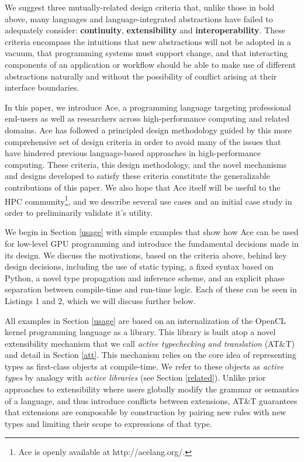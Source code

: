\documentclass{sig-alternate}
\begin{document}
We suggest three mutually-related {design criteria} that, unlike those in bold above, many languages and language-integrated abstractions have failed to adequately consider: \textbf{continuity}, \textbf{extensibility} and \textbf{interoperability}. These criteria encompass the intuitions that new abstractions will not be adopted in a vacuum, that programming systems must  support change, and that interacting components of an application or workflow should be able to make use of different abstractions naturally and without the possibility of conflict arising at their interface boundaries.

In this paper, we introduce Ace, a programming language targeting professional end-users as well as researchers across high-performance computing and related domains. Ace has followed a principled design methodology guided by this more comprehensive set of design criteria in order to avoid many of the issues that have hindered previous language-based approaches in high-performance computing. These criteria, this design methodology, and the novel mechanisms and designs developed to satisfy these criteria constitute the generalizable contributions of this paper. We also hope that Ace itself will be useful to the HPC community\footnote{\small Ace is openly available at http://acelang.org/.}, and we describe several use cases and an initial case study in order to preliminarily validate it's utility. 

 We begin in Section \ref{usage} with simple examples that show how Ace can be used for low-level GPU programming and introduce the fundamental decisions made in its design. We discuss the motivations, based on the criteria above, behind key design decisions, including the use of static typing, a fixed syntax based on Python, a novel type propagation and inference scheme, and an explicit phase separation between compile-time and run-time logic. Each of these can be seen in Listings 1 and 2, which we will discuss further below.
 
All examples in Section \ref{usage} are based on an internalization of the OpenCL kernel programming language as a library. This library is built atop a novel extensibility mechanism that we call \emph{active typechecking and translation} (AT\&T) and detail in Section \ref{att}. This mechanism relies on the core idea of representing types as first-class objects at compile-time. We refer to these objects as \emph{active types} by analogy with \emph{active libraries} \cite{activelibraries} (see Section \ref{related}). Unlike prior approaches to extensibility where users globally modify the grammar or semantics of a language, and thus introduce conflicts between extensions, AT\&T guarantees that extensions are composable by construction by pairing new rules with new types and limiting their scope to expressions of that type.
\end{document}
